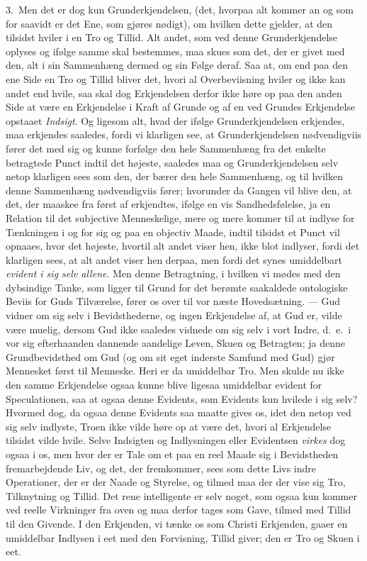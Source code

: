 \documentclass[12pt,a4paper]{book}
\newcommand{\apage}[1]{\marginnote{\footnotesize\textit{[#1]}}}
\begin{document}
3.~Men det er dog kun Grunderkjendelsen, (det, hvorpaa alt kommer an og som for
saavidt er det Ene, som gjøres nødigt), om hvilken dette gjelder, at den tilsidst
hviler i en Tro og Tillid. Alt andet, som ved denne Grunderkjendelse oplyses og
ifølge samme skal bestemmes, maa skues som det, der er givet med den, alt i sin
Sammenhæng dermed og sin Følge deraf. Saa at, om end paa den ene Side en Tro og
Tillid bliver det, hvori al Overbeviisning hviler og ikke kan andet end hvile,
saa skal dog Erkjendelsen derfor ikke høre op paa den anden Side at være \apage{46} en
Erkjendelse i Kraft af Grunde og af en ved Grundes Erkjendelse opstaaet
\emph{Indsigt}. Og ligesom alt, hvad der ifølge Grunderkjendelsen erkjendes, maa
erkjendes saaledes, fordi vi klarligen see, at Grunderkjendelsen nødvendigviis
fører det med sig og kunne forfølge den hele Sammenhæng fra det enkelte
betragtede Punct indtil det højeste, saaledes maa og Grunderkjendelsen selv netop
klarligen sees som den, der bærer den hele Sammenhæng, og til hvilken denne
Sammenhæng nødvendigviis fører; hvorunder da Gangen vil blive den, at det, der
maaskee fra først af erkjendtes, ifølge en vis Sandhedsfølelse, ja en Relation
til det subjective Menneskelige, mere og mere kommer til at indlyse for
Tænkningen i og for sig og paa en objectiv Maade, indtil tilsidst et Punct vil
opnaaes, hvor det højeste, hvortil alt andet viser hen, ikke blot indlyser, fordi
det klarligen sees, at alt andet viser hen derpaa, men fordi det synes
umiddelbart \emph{evident i sig selv allene}. Men denne Betragtning, i hvilken vi
mødes med den dybsindige Tanke, som ligger til Grund for det berømte saakaldede
ontologiske Beviis for Guds Tilværelse, fører os over til vor næste Hovedsætning.
--- Gud vidner om sig selv i Bevidsthederne, og ingen Erkjendelse af, at Gud er,
vilde være muelig, dersom Gud ikke saaledes vidnede om sig selv i vort Indre,
d.\ e.\ i vor sig efterhaanden dannende aandelige Leven, Skuen og Betragten; ja
denne \apage{47} Grundbevidsthed om Gud (og om sit eget inderste Samfund med Gud) gjør
Mennesket først til Menneske. Heri er da umiddelbar Tro. Men skulde nu ikke den
samme Erkjendelse ogsaa kunne blive ligesaa umiddelbar evident for
Speculationen, saa at ogsaa denne Evidents, som Evidents kun hvilede i sig selv?
Hvormed dog, da ogsaa denne Evidents saa maatte gives os, idet den netop ved sig
selv indlyste, Troen ikke vilde høre op at være det, hvori al Erkjendelse
tilsidst vilde hvile. Selve Indsigten og Indlysningen eller Evidentsen
\emph{virkes} dog ogsaa i os, men hvor der er Tale om et paa en reel Maade sig i
Bevidstheden fremarbejdende Liv, og det, der fremkommer, sees som dette Livs indre
Operationer, der er der Naade og Styrelse, og tilmed maa der der vise sig Tro,
Tilknytning og Tillid. Det rene intelligente er selv noget, som ogsaa kun kommer
ved reelle Virkninger fra oven og maa derfor tages som Gave, tilmed med Tillid
til den Givende. I den Erkjenden, vi tænke os som Christi Erkjenden, gaaer en
umiddelbar Indlysen i eet med den Forvisning, Tillid giver; den er Tro og Skuen i
eet.
\end{document}
